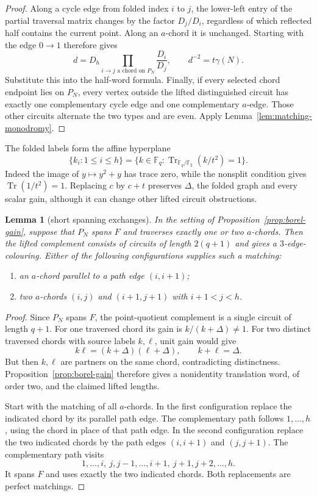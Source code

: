 \documentclass[11pt,a4paper]{article}
\newtheorem{lemma}[theorem]{Lemma}
\theoremstyle{definition}
\theoremstyle{remark}
\begin{document}
\begin{proof}
Along a cycle edge from folded index $i$ to $j$, the lower-left entry of the partial traversal matrix changes by the factor $D_j/D_i$, regardless of which reflected half contains the current point.  Along an $a$-chord it is unchanged.  Starting with the edge $0\to1$ therefore gives
\[
 d=D_h\prod_{i\to j\text{ a chord on }P_N}\frac{D_i}{D_j},
 \qquad d^{-2}=t\gamma(N).
\]
Substitute this into the half-word formula.  Finally, if every selected chord endpoint lies on $P_N$, every vertex outside the lifted distinguished circuit has exactly one complementary cycle edge and one complementary $a$-edge.  Those other circuits alternate the two types and are even.  Apply Lemma~\ref{lem:matching-monodromy}.
\end{proof}

The folded labels form the affine hyperplane
\[
 \{k_i:1\le i\le h\}
   =\{k\in\mathbb F_q:\operatorname{Tr}_{\mathbb F_q/\mathbb F_2}(k/t^2)=1\}.
\]
Indeed the image of $y\mapsto y^2+y$ has trace zero, while the nonsplit condition gives $\operatorname{Tr}(1/t^2)=1$.  Replacing $c$ by $c+t$ preserves $\Delta$, the folded graph and every scalar gain, although it can change other lifted circuit obstructions.

\begin{lemma}[short spanning exchanges]\label{lem:borel-spanning}
In the setting of Proposition~\ref{prop:borel-gain}, suppose that $P_N$ spans $F$ and traverses exactly one or two $a$-chords.  Then the lifted complement consists of circuits of length $2(q+1)$ and gives a $3$-edge-colouring.  Either of the following configurations supplies such a matching:
\begin{enumerate}
\item an $a$-chord parallel to a path edge $(i,i+1)$;
\item two $a$-chords $(i,j)$ and $(i+1,j+1)$ with $i+1<j<h$.
\end{enumerate}
\end{lemma}
\begin{proof}
Since $P_N$ spans $F$, the point-quotient complement is a single circuit of length $q+1$.  For one traversed chord its gain is $k/(k+\Delta)\ne1$.  For two distinct traversed chords with source labels $k,\ell$, unit gain would give
\[
 k\ell=(k+\Delta)(\ell+\Delta),\qquad k+\ell=\Delta.
\]
But then $k,\ell$ are partners on the same chord, contradicting distinctness.  Proposition~\ref{prop:borel-gain} therefore gives a nonidentity translation word, of order two, and the claimed lifted lengths.

Start with the matching of all $a$-chords.  In the first configuration replace the indicated chord by its parallel path edge.  The complementary path follows $1,\ldots,h$, using the chord in place of that path edge.  In the second configuration replace the two indicated chords by the path edges $(i,i+1)$ and $(j,j+1)$.  The complementary path visits
\[
 1,\ldots,i,\ j,j-1,\ldots,i+1,\ j+1,j+2,\ldots,h.
\]
It spans $F$ and uses exactly the two indicated chords.  Both replacements are perfect matchings.
\end{proof}
\end{document}
